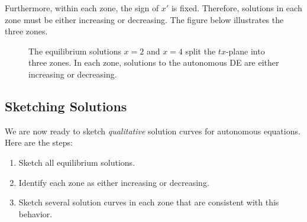 \documentclass[10pt,letterpaper]{article}
\begin{document}
Furthermore, within each zone, the sign of $x'$ is fixed. Therefore, solutions in each zone must be either increasing or decreasing. The figure below illustrates the three zones.

\begin{figure}[H]
    \centering
{}
\caption{The equilibrium solutions $x=2$ and $x=4$ split the $tx$-plane into three zones. In each zone, solutions to the autonomous DE are either increasing or decreasing.}
\end{figure}

\subsection{Sketching Solutions}
We are now ready to sketch \textit{qualitative} solution curves for autonomous equations. Here are the steps: 
\begin{enumerate}
    \item Sketch all equilibrium solutions.
    \item Identify each zone as either increasing or decreasing.
    \item Sketch several solution curves in each zone that are consistent with this behavior.
\end{enumerate}
\end{document}
